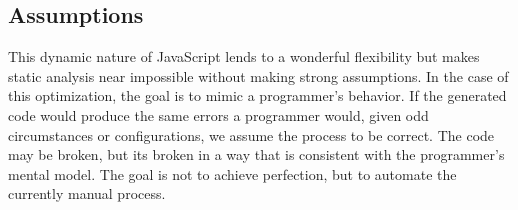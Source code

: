 \subsection{Assumptions}

This dynamic nature of JavaScript lends to a wonderful flexibility but makes static analysis near impossible without making strong assumptions.  In the case of this optimization, the goal is to mimic a programmer's behavior.  If the generated code would produce the same errors a programmer would, given odd circumstances or configurations, we assume the process to be correct.  The code may be broken, but its broken in a way that is consistent with the programmer's mental model.  The goal is not to achieve perfection, but to automate the currently manual process.  




